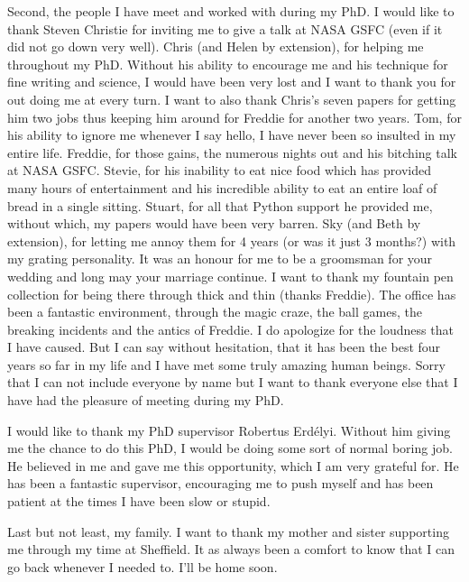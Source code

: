 \begin{acknowledgements}
    Second, the people I have meet and worked with during my PhD.
    I would like to thank Steven Christie for inviting me to give a talk at NASA GSFC (even if it did not go down very well).
    Chris (and Helen by extension), for helping me throughout my PhD.
    Without his ability to encourage me and his technique for fine writing and science, I would have been very lost and I want to thank you for out doing me at every turn.
    I want to also thank Chris's seven papers for getting him two jobs thus keeping him around for Freddie for another two years.
    Tom, for his ability to ignore me whenever I say hello, I have never been so insulted in my entire life.
    Freddie, for those gains, the numerous nights out and his bitching talk at NASA GSFC.
    Stevie, for his inability to eat nice food which has provided many hours of entertainment and his incredible ability to eat an entire loaf of bread in a single sitting. 
    Stuart, for all that Python support he provided me, without which, my papers would have been very barren.
    Sky (and Beth by extension), for letting me annoy them for 4 years (or was it just 3 months?) with my grating personality.
    It was an honour for me to be a groomsman for your wedding and long may your marriage continue.
    I want to thank my fountain pen collection for being there through thick and thin (thanks Freddie).
    The office has been a fantastic environment, through the magic craze, the ball games, the breaking incidents and the antics of Freddie. 
    I do apologize for the loudness that I have caused.
    But I can say without hesitation, that it has been the best four years so far in my life and I have met some truly amazing human beings.
    Sorry that I can not include everyone by name but I want to thank everyone else that I have had the pleasure of meeting during my PhD.
        
    I would like to thank my PhD supervisor Robertus Erd\'elyi.
    Without him giving me the chance to do this PhD, I would be doing some sort of normal boring job.
    He believed in me and gave me this opportunity, which I am very grateful for.
    He has been a fantastic supervisor, encouraging me to push myself and has been patient at the times I have been slow or stupid.
    
    Last but not least, my family.
    I want to thank my mother and sister supporting me through my time at Sheffield.
    It as always been a comfort to know that I can go back whenever I needed to.
    I'll be home soon.
    
\end{acknowledgements}